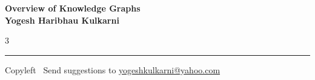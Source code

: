 \documentclass[8pt,landscape]{article}
\begin{document}
\footnotesize


\begin{center}
\Large{\textbf{Overview of Knowledge Graphs\\ Yogesh Haribhau Kulkarni}}
\end{center}

\begin{multicols}{3}

\end{multicols}

\rule{\linewidth}{0.25pt}
\scriptsize
Copyleft \textcopyleft\  Send suggestions to
\href{http://www.yogeshkulkarni.com}{yogeshkulkarni@yahoo.com}
\end{document}

